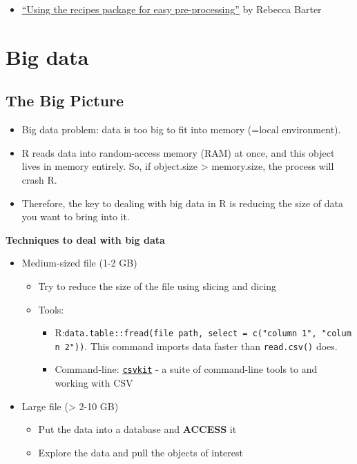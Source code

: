 \documentclass[
]{book}
\providecommand{\tightlist}{%
  \setlength{\itemsep}{0pt}\setlength{\parskip}{0pt}}
\begin{document}
\begin{itemize}
\tightlist
\item
  \href{http://www.rebeccabarter.com/blog/2019-06-06_pre_processing/}{``Using the recipes package for easy pre-processing''} by Rebecca Barter
\end{itemize}

\hypertarget{big_data}{%
\chapter{Big data}\label{big_data}}

\hypertarget{the-big-picture-10}{%
\section{The Big Picture}\label{the-big-picture-10}}

\begin{itemize}
\tightlist
\item
  Big data problem: data is too big to fit into memory (=local environment).
\item
  R reads data into random-access memory (RAM) at once, and this object lives in memory entirely. So, if object.size \textgreater{} memory.size, the process will crash R.
\item
  Therefore, the key to dealing with big data in R is reducing the size of data you want to bring into it.
\end{itemize}

\textbf{Techniques to deal with big data}

\begin{itemize}
\tightlist
\item
  Medium-sized file (1-2 GB)

  \begin{itemize}
  \tightlist
  \item
    Try to reduce the size of the file using slicing and dicing
  \item
    Tools:

    \begin{itemize}
    \tightlist
    \item
      R:\texttt{data.table::fread(file\ path,\ select\ =\ c("column\ 1",\ "column\ 2"))}. This command imports data faster than \texttt{read.csv()} does.
    \item
      Command-line: \href{https://csvkit.readthedocs.io/en/latest/}{\texttt{csvkit}} - a suite of command-line tools to and working with CSV
    \end{itemize}
  \end{itemize}
\item
  Large file (\textgreater{} 2-10 GB)

  \begin{itemize}
  \tightlist
  \item
    Put the data into a database and \textbf{ACCESS} it
  \item
    Explore the data and pull the objects of interest
  \end{itemize}
\end{itemize}
\end{document}
